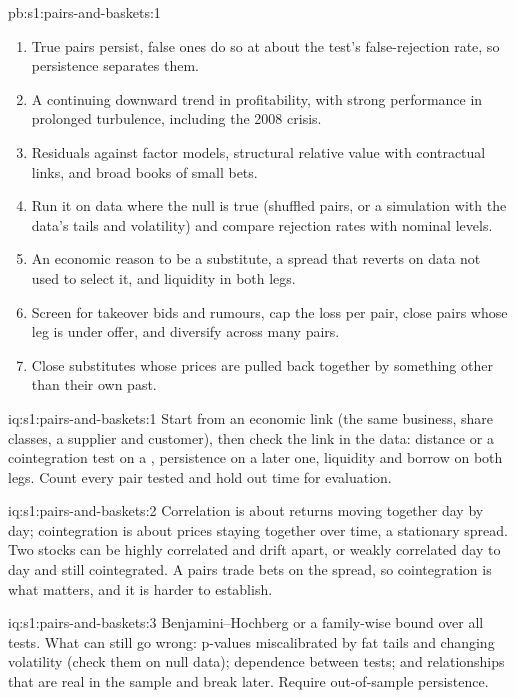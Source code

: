 \begin{solution}{pb:s1:pairs-and-baskets:1}
\begin{enumerate}
others); the distance book nets a Sharpe ratio of 5.05 on the market with substitutes and $-0.43$ on the market without.
\item True pairs persist, false ones do so at about the test's false-rejection rate, so persistence separates them.
\item A continuing downward trend in profitability, with strong performance in prolonged turbulence, including the 2008 crisis.
\item Residuals against factor models, structural relative value with contractual links, and broad books of small bets.
\item Run it on data where the null is true (shuffled pairs, or a simulation with the data's tails and volatility) and compare rejection rates with nominal
levels.
\item An economic reason to be a substitute, a spread that reverts on data not used to select it, and liquidity in both legs.
\item Screen for takeover bids and rumours, cap the loss per pair, close pairs whose leg is under offer, and diversify across many pairs.
\item Close substitutes whose prices are pulled back together by something other than their own past.
\end{enumerate}
\end{solution}

\begin{solution}{iq:s1:pairs-and-baskets:1}
Start from an economic link (the same business, share classes, a supplier and customer), then check the link in the data: distance or a cointegration test on
a , persistence on a later one, liquidity and borrow on both legs. Count every pair tested and hold out time for evaluation.
\end{solution}

\begin{solution}{iq:s1:pairs-and-baskets:2}
Correlation is about returns moving together day by day; cointegration is about prices staying together over time, a stationary spread. Two stocks can be
highly correlated and drift apart, or weakly correlated day to day and still cointegrated. A pairs trade bets on the spread, so cointegration is what matters,
and it is harder to establish.
\end{solution}

\begin{solution}{iq:s1:pairs-and-baskets:3}
Benjamini--Hochberg or a family-wise bound over all tests. What can still go wrong: p-values miscalibrated by fat tails and changing volatility (check them on
null data); dependence between tests; and relationships that are real in the sample and break later. Require out-of-sample persistence.
\end{solution}

